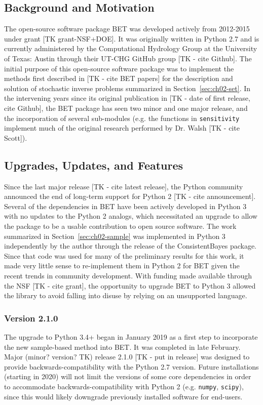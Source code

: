 \subsection{Background and Motivation}
The open-source software package BET was developed actively from 2012-2015 under grant [TK grant-NSF+DOE].
It was originally written in Python 2.7 and is currently administered by the Computational Hydrology Group at the University of Texas: Austin through their UT-CHG GitHub group [TK - cite Github].
The initial purpose of this open-source software package was to implement the methods first described in [TK - cite BET papers] for the description and solution of stochastic inverse problems summarized in Section~\ref{sec:ch02-set}.
In the intervening years since its original publication in [TK - date of first release, cite Github], the BET package has seen two minor and one major release, and the incorporation of several sub-modules (e.g. the functions in {\tt sensitivity} implement much of the original research performed by Dr. Walsh [TK - cite Scott]).


\subsection{Upgrades, Updates, and Features}
Since the last major release [TK - cite latest release], the Python community announced the end of long-term support for Python 2 [TK - cite announcement].
Several of the dependencies in BET have been actively developed in Python 3 with no updates to the Python 2 analogs, which necessitated an upgrade to allow the package to be a usable contribution to open source software.
The work summarized in Section~\ref{sec:ch02-sample} was implemented in Python 3 independently by the author through the release of the ConsistentBayes package.
Since that code was used for many of the preliminary results for this work, it made very little sense to re-implement them in Python 2 for BET given the recent trends in community development.
With funding made available through the NSF [TK - cite grant], the opportunity to upgrade BET to Python 3 allowed the library to avoid falling into disuse by relying on an unsupported language.


\subsubsection{Version 2.1.0}
The upgrade to Python 3.4+ began in January 2019 as a first step to incorporate the new sample-based method into BET.
It was completed in late February.
Major (minor? version? TK) release 2.1.0 [TK - put in release] was designed to provide backwards-compatibility with the Python 2.7 version.
Future installations (starting in 2020) will not limit the versions of some core dependencies in order to accommodate backwards-compatibility with Python 2 (e.g. {\tt numpy}, {\tt scipy}), since this would likely downgrade previously installed software for end-users.


